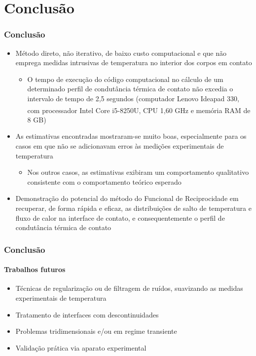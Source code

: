 \documentclass{beamer}
\begin{document}
\section{Conclusão}
\begin{frame}
	\frametitle{Conclusão}
	\begin{itemize}
		\item Método direto, não iterativo, de baixo custo computacional e que não emprega medidas intrusivas de temperatura no interior dos corpos em contato
		\begin{itemize}
			\item O tempo de execução do código computacional no cálculo de um determinado perfil de condutância térmica de contato não excedia o intervalo de tempo de 2,5 segundos (computador Lenovo Ideapad 330, com processador Intel Core\textsuperscript{\texttrademark} i5-8250U, CPU 1,60 GHz e memória RAM de 8 GB)
		\end{itemize}
		\item As estimativas encontradas mostraram-se muito boas, especialmente para os casos em que não se adicionavam erros às medições experimentais de temperatura
		\begin{itemize}
			\item Nos outros casos, as estimativas exibiram um comportamento qualitativo consistente com o comportamento teórico esperado
		\end{itemize}
		\item Demonstração do potencial do método do Funcional de Reciprocidade em recuperar, de forma rápida e eficaz, as distribuições de salto de temperatura e fluxo de calor na interface de contato, e consequentemente o perfil de condutância térmica de contato
	\end{itemize}
\end{frame}

\begin{frame}
	\frametitle{Conclusão}
	\framesubtitle{Trabalhos futuros}
	\begin{itemize}
		\item Técnicas de regularização ou de filtragem de ruídos, suavizando as medidas experimentais de temperatura
		\item Tratamento de interfaces com descontinuidades
		\item Problemas tridimensionais e/ou em regime transiente
		\item Validação prática via aparato experimental
	\end{itemize}
\end{frame}	

	
\end{document}
